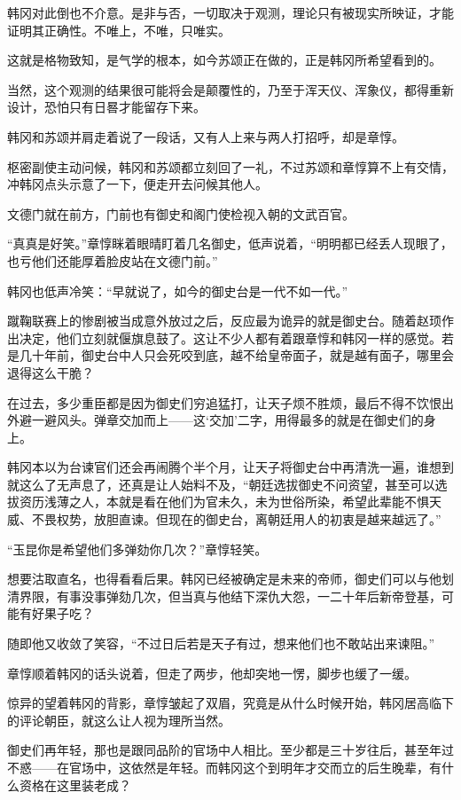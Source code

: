韩冈对此倒也不介意。是非与否，一切取决于观测，理论只有被现实所映证，才能证明其正确性。不唯上，不唯，只唯实。

这就是格物致知，是气学的根本，如今苏颂正在做的，正是韩冈所希望看到的。

当然，这个观测的结果很可能将会是颠覆性的，乃至于浑天仪、浑象仪，都得重新设计，恐怕只有日晷才能留存下来。

韩冈和苏颂并肩走着说了一段话，又有人上来与两人打招呼，却是章惇。

枢密副使主动问候，韩冈和苏颂都立刻回了一礼，不过苏颂和章惇算不上有交情，冲韩冈点头示意了一下，便走开去问候其他人。

文德门就在前方，门前也有御史和阁门使检视入朝的文武百官。

“真真是好笑。”章惇眯着眼晴盯着几名御史，低声说着，“明明都已经丢人现眼了，也亏他们还能厚着脸皮站在文德门前。”

韩冈也低声冷笑：“早就说了，如今的御史台是一代不如一代。”

蹴鞠联赛上的惨剧被当成意外放过之后，反应最为诡异的就是御史台。随着赵顼作出决定，他们立刻就偃旗息鼓了。这让不少人都有着跟章惇和韩冈一样的感觉。若是几十年前，御史台中人只会死咬到底，越不给皇帝面子，就是越有面子，哪里会退得这么干脆？

在过去，多少重臣都是因为御史们穷追猛打，让天子烦不胜烦，最后不得不饮恨出外避一避风头。弹章交加而上——这‘交加’二字，用得最多的就是在御史们的身上。

韩冈本以为台谏官们还会再闹腾个半个月，让天子将御史台中再清洗一遍，谁想到就这么了无声息了，还真是让人始料不及，“朝廷选拔御史不问资望，甚至可以选拔资历浅薄之人，本就是看在他们为官未久，未为世俗所染，希望此辈能不惧天威、不畏权势，放胆直谏。但现在的御史台，离朝廷用人的初衷是越来越远了。”

“玉昆你是希望他们多弹劾你几次？”章惇轻笑。

想要沽取直名，也得看看后果。韩冈已经被确定是未来的帝师，御史们可以与他划清界限，有事没事弹劾几次，但当真与他结下深仇大怨，一二十年后新帝登基，可能有好果子吃？

随即他又收敛了笑容，“不过日后若是天子有过，想来他们也不敢站出来谏阻。”

章惇顺着韩冈的话头说着，但走了两步，他却突地一愣，脚步也缓了一缓。

惊异的望着韩冈的背影，章惇皱起了双眉，究竟是从什么时候开始，韩冈居高临下的评论朝臣，就这么让人视为理所当然。

御史们再年轻，那也是跟同品阶的官场中人相比。至少都是三十岁往后，甚至年过不惑——在官场中，这依然是年轻。而韩冈这个到明年才交而立的后生晚辈，有什么资格在这里装老成？


